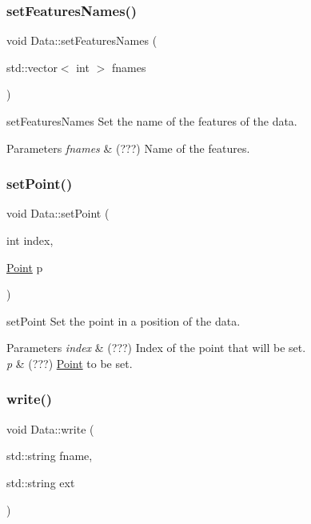 \subsubsection{\texorpdfstring{set\+Features\+Names()}{setFeaturesNames()}}
{\footnotesize\ttfamily void Data\+::set\+Features\+Names (\begin{DoxyParamCaption}\item[{std\+::vector$<$ int $>$}]{fnames }\end{DoxyParamCaption})}



set\+Features\+Names Set the name of the features of the data. 


\begin{DoxyParams}{Parameters}
{\em fnames} & (???) Name of the features. \\
\hline
\end{DoxyParams}
\mbox{\label{class_data_a9f34656f179b152407d51b04aab70748}} 
\subsubsection{\texorpdfstring{set\+Point()}{setPoint()}}
{\footnotesize\ttfamily void Data\+::set\+Point (\begin{DoxyParamCaption}\item[{int}]{index,  }\item[{\hyperlink{class_point}{Point}}]{p }\end{DoxyParamCaption})}



set\+Point Set the point in a position of the data. 


\begin{DoxyParams}{Parameters}
{\em index} & (???) Index of the point that will be set. \\
\hline
{\em p} & (???) \hyperlink{class_point}{Point} to be set. \\
\hline
\end{DoxyParams}
\mbox{\label{class_data_a6550f72555320ae9225ba216a9f4e7b3}} 
\subsubsection{\texorpdfstring{write()}{write()}}
{\footnotesize\ttfamily void Data\+::write (\begin{DoxyParamCaption}\item[{std\+::string}]{fname,  }\item[{std\+::string}]{ext }\end{DoxyParamCaption})}



